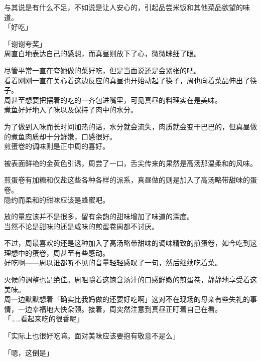 与其说是有什么不足，不如说是让人安心的，引起品尝米饭和其他菜品欲望的味道。\\

「好吃」

「谢谢夸奖」\\

周直白地表达自己的感想，而真昼则放下了心，微微眯细了眼。

尽管平常一直在夸她做的菜好吃，但是当面说还是会紧张的吧。\\

看着刚刚一直在关心着这边反应的真昼也开始动起了筷子，周也向着菜品伸出了筷子。\\

周甚至想要把摆着的吃的一齐包进嘴里，可见真昼的料理实在是美味。\\

煮鱼好好地入了味以及保持了肉中的水分。

为了做到入味而长时间加热的话，水分就会流失，肉质就会变干巴巴的，但真昼做的煮鱼肉质却十分鲜嫩，口感很好。\\

煎蛋卷的调味则是正中周的喜好。

被表面鲜艳的金黄色引诱，周尝了一口，舌尖传来的果然是高汤那温柔和的风味。

煎蛋卷有加糖和仅盐这些各种各样的派系，真昼做的则是加入了高汤略带甜味的蛋卷。\\

隐约而柔和的甜味应该是蜂蜜吧。

放的量应该并不是很多，留有余韵的甜味增加了味道的深度。\\

当然不论是甜味的还是咸味的煎蛋卷周都不讨厌。

不过，周最喜欢的还是这种加入了高汤略带甜味的调味精致的煎蛋卷，如今吃到这理想中的蛋卷，周甚至有些感动。\\

好吃啊——周以谁都听不见的音量轻轻感叹了一句，然后继续吃着菜。

火候的调整也是绝佳。周咀嚼着这饱含汤汁的口感鲜嫩的煎蛋卷，静静地享受着这美味。\\

周一边默默想着「确实比我妈做的还要好吃啊」这对不在现场的母亲有些失礼的事情，一边幸福地大快朵颐。接着，周突然注意到真昼正盯着自己在看。\\

「……看起来吃的很香呢」

「实际上也很好吃嘛。面对美味应该要抱有敬意不是么」

「嗯，这倒是」

